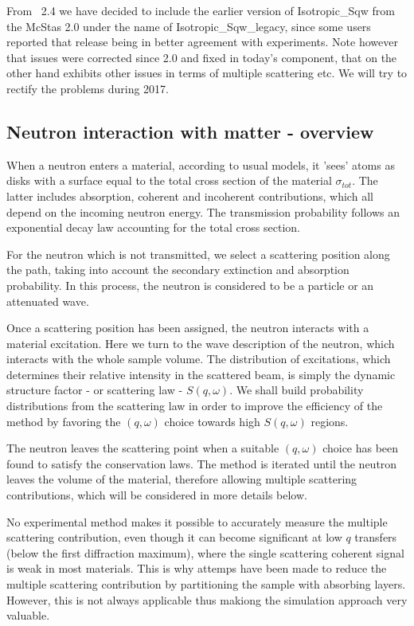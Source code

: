 From \MCS\ 2.4 we have decided to include the earlier version of Isotropic\_Sqw from the McStas 2.0 under the name of Isotropic\_Sqw\_legacy, since some users reported that release being in better agreement with experiments. 
Note however that issues were corrected since 2.0 and fixed in today's component, that on the other hand exhibits other issues in terms of multiple scattering etc. We will try to rectify the problems during 2017.

\subsection{Neutron interaction with matter - overview}

When a neutron enters a material, according to usual models, it 'sees' atoms as disks with a surface equal to the total cross section of the material $\sigma_{tot}$. The latter includes absorption, coherent and incoherent contributions, which all depend on the incoming neutron energy.
The transmission probability follows an exponential decay law accounting for the total cross section.

For the neutron which is not transmitted, we select a scattering position along the path, taking into account the secondary extinction and absorption probability. In this process, the neutron is considered to be a particle or an attenuated wave.

Once a scattering position has been assigned, the neutron interacts with a material excitation. Here we turn to the wave description of the neutron, which interacts with the whole sample volume. The distribution of excitations, which determines their relative intensity in the scattered beam, is simply the dynamic structure factor - or scattering law - $S(q,\omega)$. We shall build probability distributions from the scattering law in order to improve the efficiency of the method by favoring the $(q,\omega)$ choice towards high $S(q,\omega)$ regions.

The neutron leaves the scattering point when a suitable $(q, \omega)$ choice has been found to satisfy the conservation laws. The method is iterated until the neutron leaves the volume of the material, therefore allowing multiple scattering contributions, which will be considered in more details below.

No experimental method makes it possible to accurately measure the multiple scattering contribution, even though it can become significant at low $q$ transfers (below the first diffraction maximum), where the single scattering coherent signal is weak in most materials. This is why attemps have been made to reduce the multiple scattering contribution by partitioning the sample with absorbing layers. However, this is not always applicable thus makiong the simulation approach very valuable.

